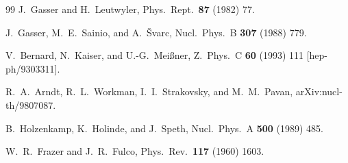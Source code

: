 \documentclass[11pt]{article}%
\begin{document}
\begin{thebibliography}{99}
  J.~Gasser and H.~Leutwyler,
  Phys.\ Rept.\  {\bf 87} (1982) 77.

  J.~Gasser, M.~E.~Sainio, and A.~\v{S}varc,
  Nucl.\ Phys.\  B {\bf 307} (1988) 779.

  V.~Bernard, N.~Kaiser, and U.-G.~Mei{\ss}ner,
  Z.\ Phys.\ C {\bf 60} (1993) 111
  [hep-ph/9303311].

  R.~A.~Arndt, R.~L.~Workman, I.~I.~Strakovsky, and M.~M.~Pavan,
  arXiv:nucl-th/9807087.

  B.~Holzenkamp, K.~Holinde, and J.~Speth,
  Nucl.\ Phys.\  A {\bf 500} (1989) 485.

  W.~R.~Frazer and J.~R.~Fulco,
  Phys.\ Rev.\  {\bf 117} (1960) 1603.


\end{thebibliography}
\end{document}
